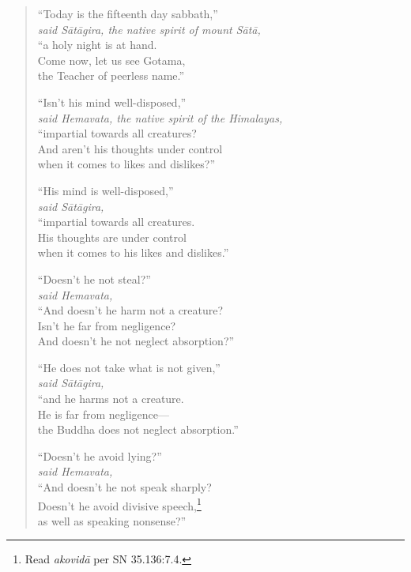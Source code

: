 \documentclass[12pt,openany]{book}%
\newcommand*{\scspeaker}[1]{\hspace{2em}\textit{#1}}
\begin{document}
\begin{verse}%
“Today is the fifteenth day sabbath,” \\
\scspeaker{said \textsanskrit{Sātāgira}, the native spirit of mount \textsanskrit{Sātā}, }\\
“a holy night is at hand. \\
Come now, let us see Gotama, \\
the Teacher of peerless name.” 

“Isn’t his mind well-disposed,” \\
\scspeaker{said Hemavata, the native spirit of the Himalayas, }\\
“impartial towards all creatures? \\
And aren’t his thoughts under control \\
when it comes to likes and dislikes?” 

“His mind is well-disposed,” \\
\scspeaker{said \textsanskrit{Sātāgira}, }\\
“impartial towards all creatures. \\
His thoughts are under control \\
when it comes to his likes and dislikes.” 

“Doesn’t he not steal?” \\
\scspeaker{said Hemavata, }\\
“And doesn’t he harm not a creature? \\
Isn’t he far from negligence? \\
And doesn’t he not neglect absorption?” 

“He does not take what is not given,” \\
\scspeaker{said \textsanskrit{Sātāgira}, }\\
“and he harms not a creature. \\
He is far from negligence—\\
the Buddha does not neglect absorption.” 

“Doesn’t he avoid lying?” \\
\scspeaker{said Hemavata, }\\
“And doesn’t he not speak sharply? \\
Doesn’t he avoid divisive speech,\footnote{Read \textit{\textsanskrit{akovidā}} per SN 35.136:7.4. } \\
as well as speaking nonsense?” 


\end{verse}
\end{document}
